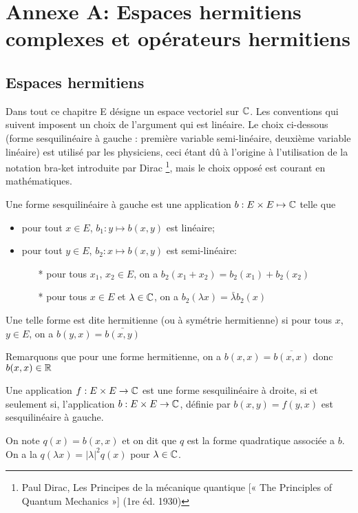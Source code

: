 \chapter*{Annexe A: Espaces hermitiens complexes et opérateurs hermitiens}
\section{Espaces hermitiens}
Dans tout ce chapitre E désigne un espace vectoriel sur $\mathbb C$. Les conventions qui suivent imposent un choix de l'argument qui est linéaire. Le choix ci-dessous (forme sesquilinéaire à gauche : première variable semi-linéaire, deuxième variable linéaire) est utilisé par les physiciens, ceci étant dû à l'origine à l'utilisation de la notation bra-ket introduite par Dirac \footnote{Paul Dirac, Les Principes de la mécanique quantique [« The Principles of Quantum Mechanics »] (1re éd. 1930) }, mais le choix opposé est courant en mathématiques.
\begin{definition}
Une forme sesquilinéaire à gauche est une application $b: E \times E \mapsto \mathbb C$ telle que
\begin{itemize}
	\item pour tout $x \in E$, $b_1: y \mapsto b(x,y)$ est linéaire;
	\item pour tout $y \in E$, $b_2: x \mapsto b(x,y)$ est semi-linéaire:
	\begin{itemize}
		\item[*] pour tous $x_1$, $x_2 \in E$, on a $b_2(x_1+x_2)=b_2(x_1)+b_2(x_2)$
		\item[*] pour tous $x \in E$ et $\lambda \in \mathbb C$, on a $b_2(\lambda x)=\bar{\lambda} b_2(x)$
	\end{itemize}
\end{itemize}
Une telle forme est dite hermitienne (ou à symétrie hermitienne) si pour tous $x$, $y \in E$, on a $b(y,x)=\bar{b(x,y)}$
\end{definition}
\begin{remark}
	Remarquons que pour une forme hermitienne, on a $b(x,x)=\overline{b(x,x)}$ donc $b(x,x) \in \mathbb R$
\end{remark}
\begin{remark}
	Une application $f : E \times E \rightarrow \mathbb C$ est une forme sesquilinéaire à droite, si et seulement si, l'application $b : E \times E \rightarrow \mathbb C$, définie par $b (x, y) = f (y, x)$ est sesquilinéaire à gauche. 
\end{remark}
On note $q(x)=b(x,x)$ et on dit que $q$ est la forme quadratique associée a $b$. On a la $q(\lambda x)= |\lambda|^2 q(x)$ pour $\lambda \in \mathbb C$.\\

